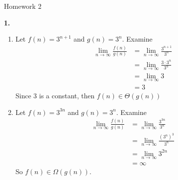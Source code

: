 \documentclass[letterpaper, 11pt]{article}
\newcommand{\hwnumber}[1]{\medskip \noindent\textbf{#1.} \smallskip}
\begin{document}
\begin{center}
	{\LARGE Homework 2}\\
\end{center}

\hwnumber{1} 

\begin{enumerate}[label = (\alph*)]
  \item Let \(f(n) = 3^{n + 1}\) and \(g(n) = 3^n\). Examine
   \begin{align*}
     \lim_{n \to \infty} \frac{f(n)}{g(n)} &= \lim_{n \to
                                                   \infty}\frac{3^{n+1}}{3^n}\\
                                           &= \lim_{n \to \infty} \frac{3 \cdot
                                           3^n}{3^n}\\
                                           &= \lim_{n \to \infty} 3\\
                                           &= 3
   \end{align*}
   Since 3 is a constant, then \(f(n) \in \Theta(g(n))\)

 \item Let \(f(n) = 3^{3n}\) and \(g(n) = 3^n\). Examine
   \begin{align*}
     \lim_{n \to \infty} \frac{f(n)}{g(n)} &= \lim_{n \to \infty}
                                                     \frac{3^{3n}}{3^n}\\
                                           &= \lim_{n \to
                                           \infty}\frac{(3^n)^3}{3^n} \\
                                           &= \lim_{n \to \infty} 3^{2n} \\
                                           &= \infty
    \end{align*}
    So \(f(n) \in \Omega(g(n))\).
\end{enumerate}
\end{document}
